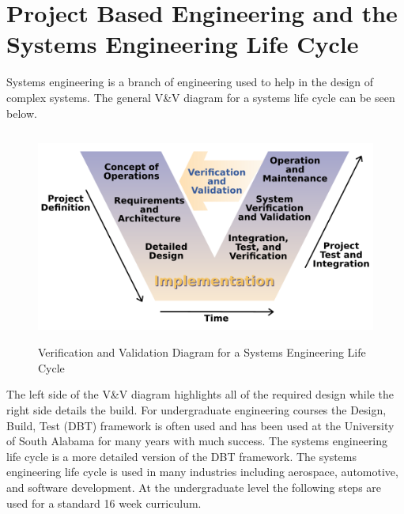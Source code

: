 \section{Project Based Engineering and the Systems Engineering Life Cycle}

Systems engineering is a branch of engineering used to help in the
design of complex systems. The general V\&V diagram for a systems life
cycle can be seen below.
\begin{figure}[H]
  \begin{center}
  \includegraphics[height=70mm]{Figures/VandV}
  \end{center}
  \caption{Verification and Validation Diagram for a Systems
    Engineering Life Cycle \cite{vandv}}
\end{figure}
The left side of the V\&V diagram highlights all of the required
design while the right side details the build. For undergraduate engineering courses the Design, Build, Test (DBT) framework is often used and has been used at the University of South Alabama for many years with much success. The systems engineering life cycle is a more detailed version of the DBT framework. The systems engineering life cycle is used in many industries including aerospace, automotive, and software development. At the undergraduate level the following steps are used for a standard 16 week curriculum.

